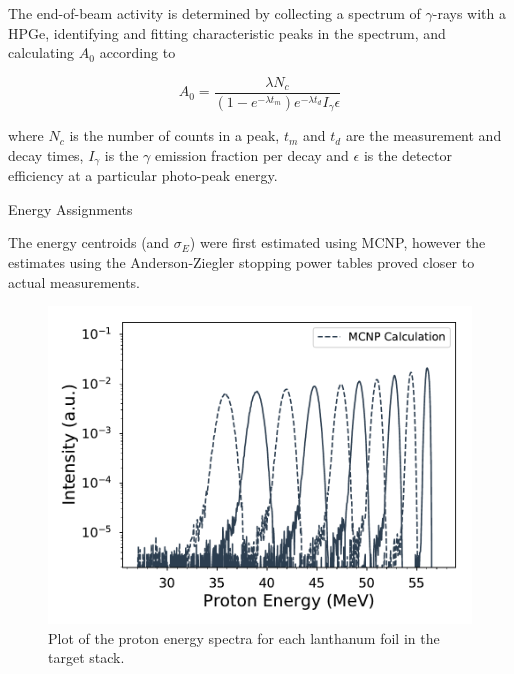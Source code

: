 \documentclass[final]{beamer}
\newlength{\onecolwid}
\newlength{\threecolwid}
\begin{document}
\begin{frame}[t]
\begin{columns}[t]
\begin{column}{\threecolwid}
\begin{columns}[t,totalwidth=\threecolwid]
\begin{column}{\onecolwid}
\begin{block}
\small{
\hspace*{50pt}The end-of-beam activity is determined by collecting a spectrum of $\gamma$-rays with a HPGe, identifying and fitting characteristic peaks in the spectrum, and calculating $A_0$ according to

\begin{equation}
A_0 = \frac{\lambda N_c}{(1-e^{-\lambda t_m})e^{-\lambda t_d}I_{\gamma}\epsilon}
\label{eq:activity}
\end{equation}

where $N_c$ is the number of counts in a peak, $t_m$ and $t_d$ are the measurement and decay times, $I_{\gamma}$ is the $\gamma$ emission fraction per decay and $\epsilon$ is the detector efficiency at a particular photo-peak energy.

}

\end{block}

\begin{block}{Energy Assignments}

\small{\hspace*{50pt}The energy centroids (and $\sigma_E$) were first estimated using MCNP, however the estimates using the Anderson-Ziegler stopping power tables proved closer to actual measurements.}

\begin{figure}
\includegraphics[width=0.8\linewidth]{monitors/La_mcnp_spectrum.pdf}

\caption{\hspace*{15pt}Plot of the proton energy spectra for each lanthanum foil in the target stack.}
\end{figure}

\end{block}


\end{column}
\end{columns}
\end{column}
\end{columns}
\end{frame}
\end{document}
